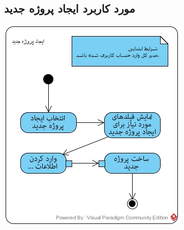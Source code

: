 \documentclass{article}
\begin{document}
\subsection*{مورد کاربرد ایجاد پروژه جدید}
\vspace{2cm}
\begin{center}
\includegraphics[width=\textwidth]{ActivityDiagrams/33.jpg}
\end{center}

\newpage
\vspace{1cm}
\end{document}
